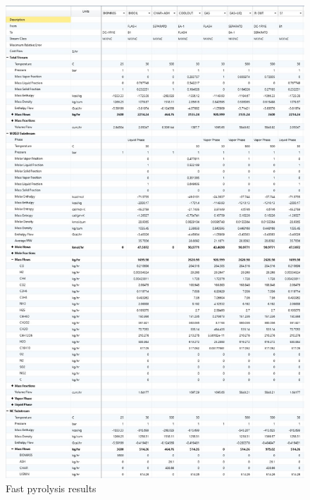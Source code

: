 \newpage %
\begin{figure}[h!]
	\centering
	\includegraphics[width=0.91\linewidth]{Figures/TchermochemicalProcesses/PyrolysisResults.jpg}
	\caption{Fast pyrolysis results}
\end{figure}